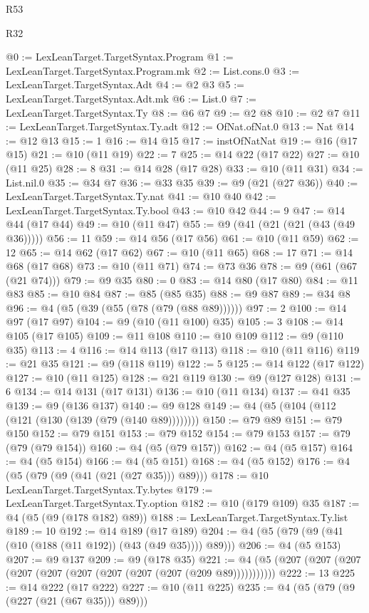 \begin{lexlean}{R53}
\begin{lexlean}{R32}
\begin{coremodule}
{{{{{{{{{{{{{{{{{{{{{{{{{{{{{{{{{{{{{{{{{{{{{{{{{{{@0 := LexLeanTarget.TargetSyntax.Program
@1 := LexLeanTarget.TargetSyntax.Program.mk
@2 := List.cons.{0}
@3 := LexLeanTarget.TargetSyntax.Adt
@4 := @2 @3
@5 := LexLeanTarget.TargetSyntax.Adt.mk
@6 := List.{0}
@7 := LexLeanTarget.TargetSyntax.Ty
@8 := @6 @7
@9 := @2 @8
@10 := @2 @7
@11 := LexLeanTarget.TargetSyntax.Ty.adt
@12 := OfNat.ofNat.{0}
@13 := Nat
@14 := @12 @13
@15 := 1
@16 := @14 @15
@17 := instOfNatNat
@19 := @16 (@17 @15)
@21 := @10 (@11 @19)
@22 := 7
@25 := @14 @22 (@17 @22)
@27 := @10 (@11 @25)
@28 := 8
@31 := @14 @28 (@17 @28)
@33 := @10 (@11 @31)
@34 := List.nil.{0}
@35 := @34 @7
@36 := @33 @35
@39 := @9 (@21 (@27 @36))
@40 := LexLeanTarget.TargetSyntax.Ty.nat
@41 := @10 @40
@42 := LexLeanTarget.TargetSyntax.Ty.bool
@43 := @10 @42
@44 := 9
@47 := @14 @44 (@17 @44)
@49 := @10 (@11 @47)
@55 := @9 (@41 (@21 (@21 (@43 (@49 @36)))))
@56 := 11
@59 := @14 @56 (@17 @56)
@61 := @10 (@11 @59)
@62 := 12
@65 := @14 @62 (@17 @62)
@67 := @10 (@11 @65)
@68 := 17
@71 := @14 @68 (@17 @68)
@73 := @10 (@11 @71)
@74 := @73 @36
@78 := @9 (@61 (@67 (@21 @74)))
@79 := @9 @35
@80 := 0
@83 := @14 @80 (@17 @80)
@84 := @11 @83
@85 := @10 @84
@87 := @85 (@85 @35)
@88 := @9 @87
@89 := @34 @8
@96 := @4 (@5 (@39 (@55 (@78 (@79 (@88 @89))))))
@97 := 2
@100 := @14 @97 (@17 @97)
@104 := @9 (@10 (@11 @100) @35)
@105 := 3
@108 := @14 @105 (@17 @105)
@109 := @11 @108
@110 := @10 @109
@112 := @9 (@110 @35)
@113 := 4
@116 := @14 @113 (@17 @113)
@118 := @10 (@11 @116)
@119 := @21 @35
@121 := @9 (@118 @119)
@122 := 5
@125 := @14 @122 (@17 @122)
@127 := @10 (@11 @125)
@128 := @21 @119
@130 := @9 (@127 @128)
@131 := 6
@134 := @14 @131 (@17 @131)
@136 := @10 (@11 @134)
@137 := @41 @35
@139 := @9 (@136 @137)
@140 := @9 @128
@149 := @4 (@5 (@104 (@112 (@121 (@130 (@139 (@79 (@140 @89))))))))
@150 := @79 @89
@151 := @79 @150
@152 := @79 @151
@153 := @79 @152
@154 := @79 @153
@157 := @79 (@79 (@79 @154))
@160 := @4 (@5 (@79 @157))
@162 := @4 (@5 @157)
@164 := @4 (@5 @154)
@166 := @4 (@5 @151)
@168 := @4 (@5 @152)
@176 := @4 (@5 (@79 (@9 (@41 (@21 (@27 @35))) @89)))
@178 := @10 LexLeanTarget.TargetSyntax.Ty.bytes
@179 := LexLeanTarget.TargetSyntax.Ty.option
@182 := @10 (@179 @109) @35
@187 := @4 (@5 (@9 (@178 @182) @89))
@188 := LexLeanTarget.TargetSyntax.Ty.list
@189 := 10
@192 := @14 @189 (@17 @189)
@204 := @4 (@5 (@79 (@9 (@41 (@10 (@188 (@11 @192)) (@43 (@49 @35)))) @89)))
@206 := @4 (@5 @153)
@207 := @9 @137
@209 := @9 (@178 @35)
@221 := @4 (@5 (@207 (@207 (@207 (@207 (@207 (@207 (@207 (@207 (@207 (@209 @89)))))))))))
@222 := 13
@225 := @14 @222 (@17 @222)
@227 := @10 (@11 @225)
@235 := @4 (@5 (@79 (@9 (@227 (@21 (@67 @35))) @89)))
}}}}}}}}}}}}}}}}}}}}}}}}}}}}}}}}}}}}}}}}}}}}}}}}}}}
\end{coremodule}
\end{lexlean}
\end{lexlean}
